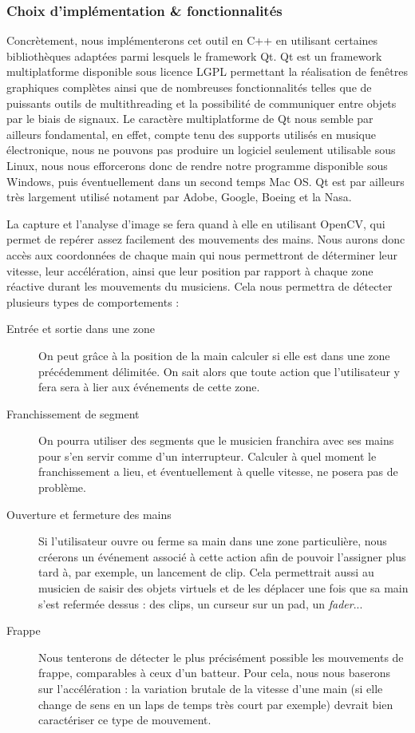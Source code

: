 \subsubsection*{Choix d’implémentation \& fonctionnalités}

\par Concrètement, nous implémenterons cet outil en C++ en utilisant certaines bibliothèques adaptées parmi lesquels le framework Qt.
Qt est un framework multiplatforme disponible sous licence LGPL permettant la réalisation de fenêtres graphiques complètes ainsi que de nombreuses fonctionnalités telles que de puissants outils de multithreading et la possibilité de communiquer entre objets par le biais de signaux. Le caractère multiplatforme de Qt nous semble par ailleurs fondamental, en effet, compte tenu des supports utilisés en musique électronique, nous ne pouvons pas produire un logiciel seulement utilisable sous Linux, nous nous efforcerons donc de rendre notre programme disponible sous Windows, puis éventuellement dans un second temps Mac OS. Qt est par ailleurs très largement utilisé notament par Adobe, Google, Boeing et la Nasa.

\par La capture et l'analyse d'image se fera quand à elle en utilisant OpenCV, qui permet de repérer assez facilement des mouvements des mains. Nous aurons donc accès aux coordonnées de chaque main qui nous permettront de déterminer leur vitesse, leur accélération, ainsi que leur position par rapport à chaque zone réactive durant les mouvements du musiciens. Cela nous permettra de détecter plusieurs types de comportements :
\begin{description}

	\item[Entrée et sortie dans une zone] On peut grâce à la position de la main calculer si elle est dans une zone précédemment délimitée. On sait alors que toute action que l'utilisateur y fera sera à lier aux événements de cette zone.
	\item[Franchissement de segment] On pourra utiliser des segments que le musicien franchira avec ses mains pour s'en servir comme d'un interrupteur. Calculer à quel moment le franchissement a lieu, et éventuellement à quelle vitesse, ne posera pas de problème.
	\item[Ouverture et fermeture des mains] Si l'utilisateur ouvre ou ferme sa main dans une zone particulière, nous créerons un événement associé à cette action afin de pouvoir l'assigner plus tard à, par exemple, un lancement de clip. Cela permettrait aussi au musicien de saisir des objets virtuels et de les déplacer une fois que sa main s'est refermée dessus : des clips, un curseur sur un pad, un \emph{fader}...
	\item[Frappe] Nous tenterons de détecter le plus précisément possible les mouvements de frappe, comparables à ceux d'un batteur. Pour cela, nous nous baserons sur l’accélération : la variation brutale de la vitesse d'une main (si elle change de sens en un laps de temps très court par exemple) devrait bien caractériser ce type de mouvement.
\end{description}


